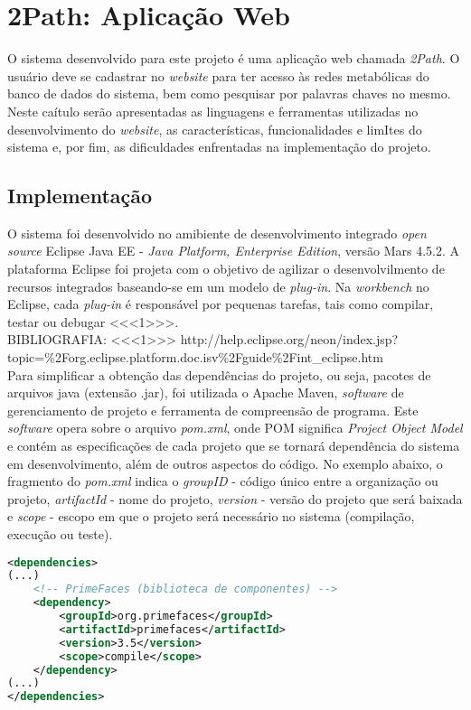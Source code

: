 \chapter{2Path: Aplicação Web}

\indent O sistema desenvolvido para este projeto é uma aplicação web chamada \textit{2Path}. O usuário deve se cadastrar no \textit{website} para ter acesso às redes metabólicas do banco de dados do sistema, bem como pesquisar por palavras chaves no mesmo. Neste caítulo serão apresentadas as linguagens e ferramentas utilizadas no desenvolvimento do \textit{website}, as características, funcionalidades e limItes do sistema e, por fim, as dificuldades enfrentadas na implementação do projeto.

\section{Implementação}

\indent O sistema foi desenvolvido no amibiente de desenvolvimento integrado \textit{open source} Eclipse Java EE - \textit{Java Platform, Enterprise Edition}, versão Mars 4.5.2. A plataforma Eclipse foi projeta com o objetivo de agilizar o desenvolvilmento de recursos integrados baseando-se em um modelo de \textit{plug-in}. Na \textit{workbench} no Eclipse, cada \textit{plug-in} é responsável por pequenas tarefas, tais como compilar, testar ou debugar <<<1>>>. \\
BIBLIOGRAFIA: <<<1>>> http://help.eclipse.org/neon/index.jsp?topic=\%2Forg.eclipse.platform.doc.isv\%2Fguide\%2Fint_eclipse.htm \\

\indent Para simplificar a obtenção das dependências do projeto, ou seja, pacotes de arquivos java (extensão .jar), foi utilizada o Apache Maven, \textit{software} de gerenciamento de projeto e ferramenta de compreensão de programa. Este \textit{software} opera sobre o arquivo \textit{pom.xml}, onde POM significa \textit{Project Object Model} e contém as especificações de cada projeto que se tornará dependência do sistema em desenvolvimento, além de outros aspectos do código. No exemplo abaixo, o fragmento do \textit{pom.xml} indica o \textit{groupID} - código único entre a organização ou projeto, \textit{artifactId} - nome do projeto, \textit{version} - versão do projeto que será baixada e \textit{scope} - escopo em que o projeto será necessário no sistema (compilação, execução ou teste). \\

\begin{lstlisting}[language=XML]
<dependencies>
(...)
	<!-- PrimeFaces (biblioteca de componentes) -->
	<dependency>
		<groupId>org.primefaces</groupId>
		<artifactId>primefaces</artifactId>
		<version>3.5</version>
		<scope>compile</scope>
	</dependency>
(...)
</dependencies>
\end{lstlisting}

